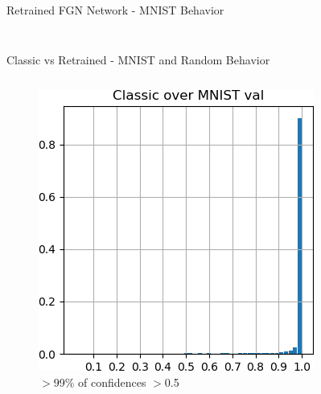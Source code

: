 \documentclass{beamer}
\begin{document}
\begin{frame}{Retrained FGN Network - MNIST Behavior}
\begin{columns}
\begin{column}{.5\textwidth}
\begin{figure}
        \caption*{}
    \end{figure}
    \end{column}
    \end{columns}
    
\end{frame}

\begin{frame}{Classic vs Retrained - MNIST and Random Behavior}

    \vspace{-3mm}
    \begin{columns}
    \begin{column}{.33\textwidth}
    \begin{figure}
        \includegraphics[width=.85\textwidth]{images/mnist-behavior/classic-hist-val.png}
        \centering \tiny{$>$99\% of confidences $>$0.5}
    \end{figure}
    \end{column}
    \begin{column}{.33\textwidth}
    \begin{figure}

\end{figure}
\end{column}
\end{columns}
\end{frame}
\end{document}

